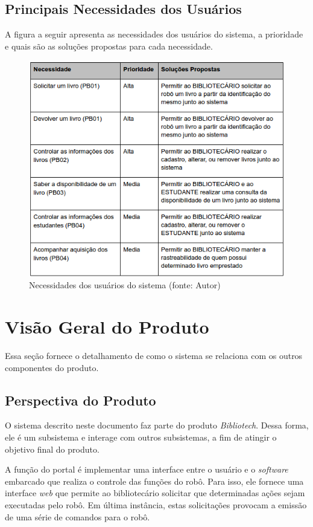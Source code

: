 \subsection{Principais Necessidades dos Usuários}
A figura a seguir apresenta as necessidades dos usuários do sistema, a prioridade e quais são as soluções propostas para cada necessidade.

\begin{figure}[!h]
\centering
\includegraphics[scale=0.65, angle = 360]{figuras/necessidades_soft}
\caption[]{Necessidades dos usuários do sistema (fonte: Autor)}
\end{figure}
\FloatBarrier

\section{Visão Geral do Produto}
Essa seção fornece o detalhamento de como o sistema se relaciona com os outros componentes do produto.

\subsection{Perspectiva do Produto}
O sistema descrito neste documento faz parte do produto \textit{Bibliotech}. Dessa forma, ele é um subsistema e interage com outros subsistemas, a fim de atingir o objetivo final do produto.

A função do portal é implementar uma interface entre o usuário e o \textit{software} embarcado que realiza o controle das funções do robô. Para isso, ele fornece uma interface \textit{web} que permite ao bibliotecário solicitar que determinadas ações sejam executadas pelo robô. Em última instância, estas solicitações provocam a emissão de uma série de comandos para o robô.

